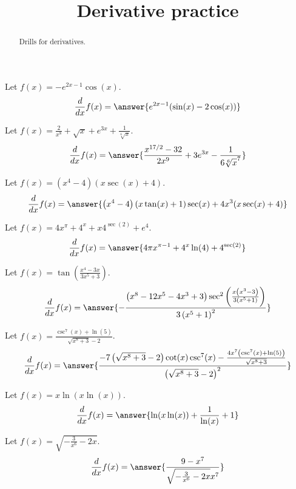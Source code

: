 \documentclass{ximera}
\title[Reinforce:]{Derivative practice}
\begin{document}
\begin{abstract}
  Drills for derivatives.
\end{abstract}
\maketitle


\begin{shuffle}


\begin{exercise}
Let $f(x)=-e^{2 x-1} \cos (x)$.
\[
\ddx f(x) = \answer{e^{2 x-1} (\sin (x)-2 \cos (x))}
\]
\end{exercise}

\begin{exercise}
Let $f(x)=\frac{2}{x^8}+\sqrt{x}+e^{3 x}+\frac{1}{\sqrt[6]{x}}$.
\[
\ddx f(x) = \answer{\frac{x^{17/2}-32}{2 x^9}+3 e^{3 x}-\frac{1}{6 \sqrt[6]{x}^7}}
\]
\end{exercise}

\begin{exercise}
Let $f(x)=\left(x^4-4\right) (x \sec (x)+4)$.
\[
\ddx f(x) = \answer{\left(x^4-4\right) (x \tan (x)+1) \sec (x)+4 x^3 (x \sec (x)+4)}
\]
\end{exercise}

\begin{exercise}
Let $f(x)=4 x^{\pi }+4^x+x 4^{\sec (2)}+e^4$.
\[
\ddx f(x) = \answer{4 \pi  x^{\pi -1}+4^x \ln (4)+4^{\sec (2)}}
\]
\end{exercise}

\begin{exercise}
Let $f(x)=\tan \left(\frac{x^4-3 x}{3 x^5+3}\right)$.
\[
\ddx f(x) = \answer{-\frac{\left(x^8-12 x^5-4 x^3+3\right) \sec ^2\left(\frac{x \left(x^3-3\right)}{3 \left(x^5+1\right)}\right)}{3 \left(x^5+1\right)^2}}
\]
\end{exercise}

\begin{exercise}
Let $f(x)=\frac{\csc ^7(x)+\ln (5)}{\sqrt{x^8+3}-2}$.
\[
\ddx f(x) = \answer{\frac{-7 \left(\sqrt{x^8+3}-2\right) \cot (x) \csc ^7(x)-\frac{4 x^7 \left(\csc ^7(x)+\ln (5)\right)}{\sqrt{x^8+3}}}{\left(\sqrt{x^8+3}-2\right)^2}}
\]
\end{exercise}

\begin{exercise}
Let $f(x)=x \ln (x \ln (x))$.
\[
\ddx f(x) = \answer{\ln (x \ln (x))+\frac{1}{\ln (x)}+1}
\]
\end{exercise}

\begin{exercise}
Let $f(x)=\sqrt{-\frac{3}{x^6}-2 x}$.
\[
\ddx f(x) = \answer{\frac{9-x^7}{\sqrt{-\frac{3}{x^6}-2 x} x^7}}
\]
\end{exercise}


\end{shuffle}
\end{document}
